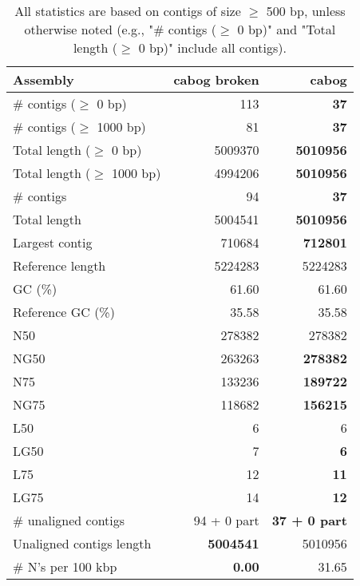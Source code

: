 \documentclass[12pt,a4paper]{article}
\begin{document}
\begin{table}[ht]
\begin{center}
\caption{All statistics are based on contigs of size $\geq$ 500 bp, unless otherwise noted (e.g., "\# contigs ($\geq$ 0 bp)" and "Total length ($\geq$ 0 bp)" include all contigs).}
\begin{tabular}{|l*{2}{|r}|}
\hline
Assembly & cabog broken & cabog \\ \hline
\# contigs ($\geq$ 0 bp) & 113 & {\bf 37} \\ \hline
\# contigs ($\geq$ 1000 bp) & 81 & {\bf 37} \\ \hline
Total length ($\geq$ 0 bp) & 5009370 & {\bf 5010956} \\ \hline
Total length ($\geq$ 1000 bp) & 4994206 & {\bf 5010956} \\ \hline
\# contigs & 94 & {\bf 37} \\ \hline
Total length & 5004541 & {\bf 5010956} \\ \hline
Largest contig & 710684 & {\bf 712801} \\ \hline
Reference length & 5224283 & 5224283 \\ \hline
GC (\%) & 61.60 & 61.60 \\ \hline
Reference GC (\%) & 35.58 & 35.58 \\ \hline
N50 & 278382 & 278382 \\ \hline
NG50 & 263263 & {\bf 278382} \\ \hline
N75 & 133236 & {\bf 189722} \\ \hline
NG75 & 118682 & {\bf 156215} \\ \hline
L50 & 6 & 6 \\ \hline
LG50 & 7 & {\bf 6} \\ \hline
L75 & 12 & {\bf 11} \\ \hline
LG75 & 14 & {\bf 12} \\ \hline
\# unaligned contigs & 94 + 0 part & {\bf 37 + 0 part} \\ \hline
Unaligned contigs length & {\bf 5004541} & 5010956 \\ \hline
\# N's per 100 kbp & {\bf 0.00} & 31.65 \\ \hline
\end{tabular}
\end{center}
\end{table}
\end{document}
